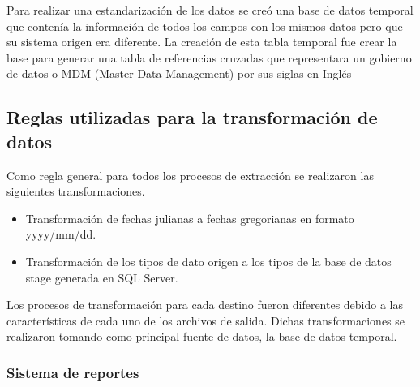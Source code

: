 Para realizar una estandarización de los datos se creó una base de datos
temporal que contenía la información de todos los campos con los mismos datos
pero que su sistema origen era diferente. La creación de esta tabla temporal fue
crear la base para generar una tabla de referencias cruzadas que representara un
gobierno de datos o MDM (Master Data Management) por sus siglas en Inglés

\subsection{Reglas utilizadas para la transformación de datos}

Como regla general para todos los procesos de extracción se realizaron las
siguientes transformaciones.

\begin{itemize}
\item Transformación de fechas julianas a fechas gregorianas en formato
  \linebreak \mbox{yyyy/mm/dd}.
\item Transformación de los tipos de dato origen a los tipos de la base de
  datos stage generada en SQL Server.
\end{itemize}

Los procesos de transformación para cada destino fueron diferentes debido a las
características de cada uno de los archivos de salida. Dichas transformaciones
se realizaron tomando como principal fuente de datos, la base de datos temporal.

\subsubsection{Sistema de reportes}

